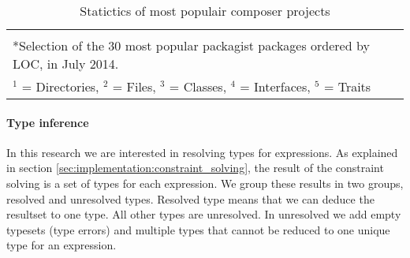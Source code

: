 \documentclass[../main.tex]{subfiles}
\begin{document}
\begin{table}[H]
\begin{tabular}{@{}lllrrrrrrrr@{}}
  \bottomrule
     \multicolumn{11}{l}{} \\
     \multicolumn{11}{l}{*Selection of the 30 most popular packagist packages ordered by LOC, in July 2014.} \\
     \multicolumn{11}{l}{$^1$ = Directories, $^2$ = Files, $^3$ = Classes, $^4$ = Interfaces, $^5$ = Traits} \\
  \end{tabular}
  \normalsize
  \caption{Statictics of most populair composer projects\label{table:corpus}}
\end{table}
\npfourdigitnosep
\npnoaddmissingzero

	\paragraph{Type inference}
	In this research we are interested in resolving types for expressions.
	As explained in section \ref{sec:implementation:constraint_solving}, the result of the constraint solving is a set of types for each expression.
	We group these results in two groups, resolved and unresolved types.
	Resolved type means that we can deduce the resultset to one type.
	All other types are unresolved.
	In unresolved we add empty typesets (type errors) and multiple types that cannot be reduced to one unique type for an expression.
	
\end{document}
